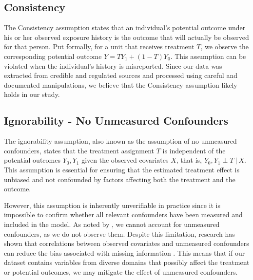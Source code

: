 \documentclass{article}
\newcommand{\gur}[1]{{\color{teal}{Gur: #1}}}
\begin{document}
\subsection{Consistency}

The Consistency assumption states that an individual's potential outcome under his or her observed exposure history is the outcome that will actually be observed for that person. Put formally, for a unit that receives treatment $T$, we observe the corresponding potential outcome $Y = TY_1 + (1-T)Y_0$. This assumption can be violated when the individual's history is misreported. Since our data was extracted from credible and regulated sources and processed using careful and documented manipulations, we believe that the Consistency assumption likely holds in our study. 

\gur{elaborate more? Data Source Reliability, Clear Treatment Definition, Outcome Measurement, Data Processing Transparency, Stable Treatment}


\subsection{Ignorability - No Unmeasured Confounders}





The ignorability assumption, also known as the assumption of no unmeasured confounders, states that the treatment assignment \( T \) is independent of the potential outcomes \( Y_0, Y_1 \) given the observed covariates \( X \), that is, \( Y_0, Y_1 \perp T \ | \ X \). This assumption is essential for ensuring that the estimated treatment effect is unbiased and not confounded by factors affecting both the treatment and the outcome.

However, this assumption is inherently unverifiable in practice since it is impossible to confirm whether all relevant confounders have been measured and included in the model. As noted by \citet{hernan2006estimating}, we cannot account for unmeasured confounders, as we do not observe them. Despite this limitation, research has shown that correlations between observed covariates and unmeasured confounders can reduce the bias associated with missing information \citep{schulz2023no}. This means that if our dataset contains variables from diverse domains that possibly affect the treatment or potential outcomes, we may mitigate the effect of unmeasured confounders.
\end{document}
